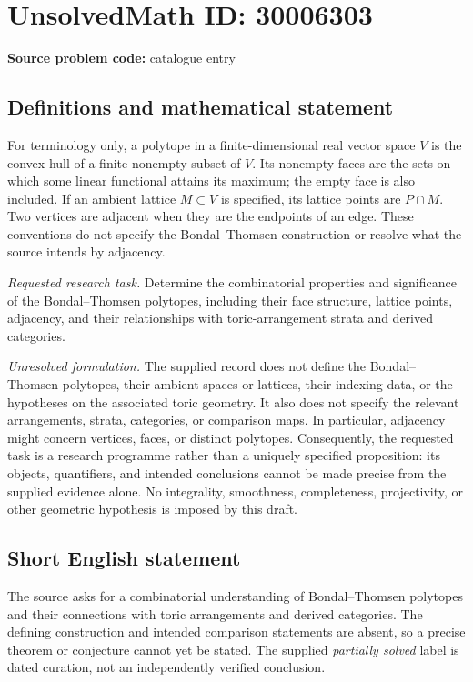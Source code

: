 \documentclass[11pt]{article}
\begin{document}
\section*{UnsolvedMath ID: 30006303}
\textbf{Source problem code:} catalogue entry
\subsection{Definitions and mathematical statement}
For terminology only, a polytope in a finite-dimensional real vector space \(V\) is the convex hull of a finite nonempty subset of \(V\). Its nonempty faces are the sets on which some linear functional attains its maximum; the empty face is also included. If an ambient lattice \(M\subset V\) is specified, its lattice points are \(P\cap M\). Two vertices are adjacent when they are the endpoints of an edge. These conventions do not specify the Bondal--Thomsen construction or resolve what the source intends by adjacency.

\emph{Requested research task.} Determine the combinatorial properties and significance of the Bondal--Thomsen polytopes, including their face structure, lattice points, adjacency, and their relationships with toric-arrangement strata and derived categories.

\emph{Unresolved formulation.} The supplied record does not define the Bondal--Thomsen polytopes, their ambient spaces or lattices, their indexing data, or the hypotheses on the associated toric geometry. It also does not specify the relevant arrangements, strata, categories, or comparison maps. In particular, adjacency might concern vertices, faces, or distinct polytopes. Consequently, the requested task is a research programme rather than a uniquely specified proposition: its objects, quantifiers, and intended conclusions cannot be made precise from the supplied evidence alone. No integrality, smoothness, completeness, projectivity, or other geometric hypothesis is imposed by this draft.
\subsection{Short English statement}
The source asks for a combinatorial understanding of Bondal--Thomsen polytopes and their connections with toric arrangements and derived categories. The defining construction and intended comparison statements are absent, so a precise theorem or conjecture cannot yet be stated. The supplied \emph{partially solved} label is dated curation, not an independently verified conclusion.
\end{document}
